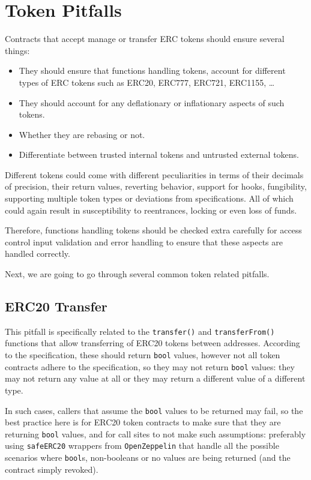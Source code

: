 \section{Token Pitfalls}\label{token-pitfalls}

Contracts that accept manage or transfer ERC tokens should ensure
several things:

\begin{itemize}
\tightlist
\item
  They should ensure that functions handling tokens, account for
  different types of ERC tokens such as ERC20, ERC777, ERC721, ERC1155,
  \ldots{}
\item
  They should account for any deflationary or inflationary aspects of
  such tokens.
\item
  Whether they are rebasing or not.
\item
  Differentiate between trusted internal tokens and untrusted external
  tokens.
\end{itemize}

Different tokens could come with different peculiarities in terms of
their decimals of precision, their return values, reverting behavior,
support for hooks, fungibility, supporting multiple token types or
deviations from specifications. All of which could again result in
susceptibility to reentrances, locking or even loss of funds.

Therefore, functions handling tokens should be checked extra carefully
for access control input validation and error handling to ensure that
these aspects are handled correctly.

Next, we are going to go through several common token related pitfalls.

\subsection{ERC20 Transfer}\label{erc20-transfer}

This pitfall is specifically related to the \texttt{transfer()} and
\texttt{transferFrom()} functions that allow transferring of ERC20
tokens between addresses. According to the specification, these should
return \texttt{bool} values, however not all token contracts adhere to
the specification, so they may not return \texttt{bool} values: they may
not return any value at all or they may return a different value of a
different type.

In such cases, callers that assume the \texttt{bool} values to be
returned may fail, so the best practice here is for ERC20 token
contracts to make sure that they are returning \texttt{bool} values, and
for call sites to not make such assumptions: preferably using
\texttt{safeERC20} wrappers from \texttt{OpenZeppelin} that handle all
the possible scenarios where \texttt{bool}s, non-booleans or no values
are being returned (and the contract simply revoked).

